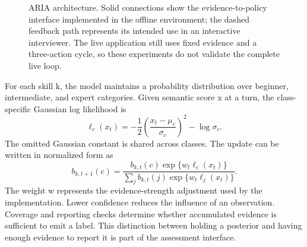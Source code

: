 \documentclass[10pt,a4paper]{article}
\begin{document}
\begin{figure}[htbp]
\centering
{}
\caption{ARIA architecture. Solid connections show the evidence-to-policy interface implemented in the offline environment; the dashed feedback path represents its intended use in an interactive interviewer. The live application still uses fixed evidence and a three-action cycle, so these experiments do not validate the complete live loop.}
\label{fig:architecture}
\end{figure}

For each skill k, the model maintains a probability distribution over beginner, intermediate, and expert categories. Given semantic score x at a turn, the class-specific Gaussian log likelihood is
\begin{equation}
\ell_c(x_t)=-\frac{1}{2}\left(\frac{x_t-\mu_c}{\sigma_c}\right)^2-\log\sigma_c.
\end{equation}
The omitted Gaussian constant is shared across classes. The update can be written in normalized form as
\begin{equation}
b_{k,t+1}(c)=\frac{b_{k,t}(c)\exp\{w_t\ell_c(x_t)\}}{\sum_j b_{k,t}(j)\exp\{w_t\ell_j(x_t)\}}.
\end{equation}
The weight w represents the evidence-strength adjustment used by the implementation. Lower confidence reduces the influence of an observation. Coverage and reporting checks determine whether accumulated evidence is sufficient to emit a label. This distinction between holding a posterior and having enough evidence to report it is part of the assessment interface.
\end{document}
